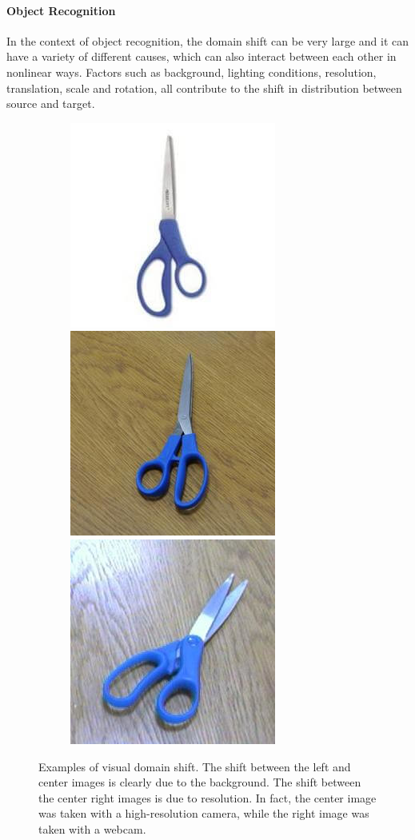 \documentclass[../main.tex]{subfiles}
\begin{document}
    \paragraph{Object Recognition}
    In the context of object recognition, the domain shift can be very large and it can have a variety
    of different causes, which can also interact between each other in nonlinear ways. Factors such as background, lighting
    conditions, resolution, translation, scale and rotation, all contribute to the shift in distribution between source and target.
    
    \begin{figure}[h!]
        \centering

        \begin{subfigure}{\linewidth}
        	\includegraphics[width=.3\linewidth]{img/amazon-scissor.png}\label{fig:amazon-scissor}\hfill
        	\includegraphics[width=.3\linewidth]{img/dslr-scissor.png}\label{fig:dslr-scissor}\hfill
            \includegraphics[width=.3\linewidth]{img/webcam-scissor.png}\label{fig:webcam-scissor}
        \end{subfigure}

        \caption{Examples of visual domain shift. The shift between the left and center images is clearly
            due to the background. The shift between the center right images is due to resolution. In fact, the center
            image was taken with a high-resolution camera, while the right image was taken with a webcam.}\label{fig:domain-shift-office}
	\end{figure}
\end{document}
